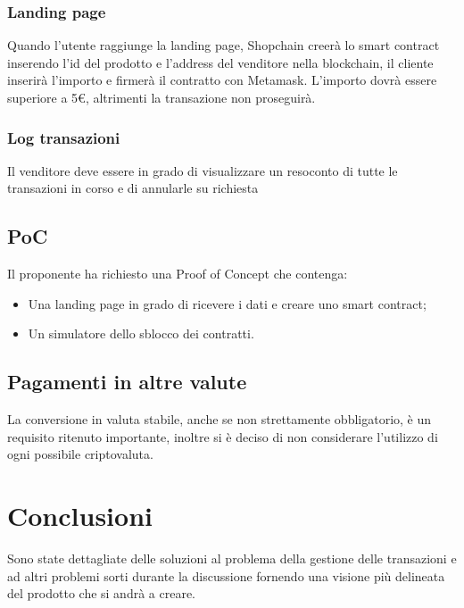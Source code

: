 \documentclass[a4paper, 12pt]{article}
\begin{document}
\subsubsection{Landing page}
Quando l'utente raggiunge la landing page, Shopchain creerà lo smart contract inserendo l'id del prodotto e l'address del venditore nella blockchain, il cliente inserirà l'importo e firmerà il contratto con Metamask.  L'importo dovrà essere superiore a 5€, altrimenti la transazione non proseguirà.
\subsubsection{Log transazioni}
Il venditore deve essere in grado di visualizzare un resoconto di tutte le transazioni in corso e di annularle su richiesta
\subsection{PoC}
Il proponente ha richiesto una Proof of Concept che contenga:
	\begin{itemize}
		\item Una landing page in grado di ricevere i dati e creare uno smart contract;
		\item Un simulatore dello sblocco dei contratti.
	\end{itemize}  
\subsection{Pagamenti in altre valute}
La conversione in valuta stabile, anche se non strettamente obbligatorio, è un requisito ritenuto importante, inoltre si è deciso di non considerare l'utilizzo di ogni possibile criptovaluta.

\section{Conclusioni}
Sono state dettagliate delle soluzioni al problema della gestione delle transazioni e ad altri problemi sorti durante la discussione fornendo una visione più delineata del prodotto che si andrà a creare.
\end{document}
